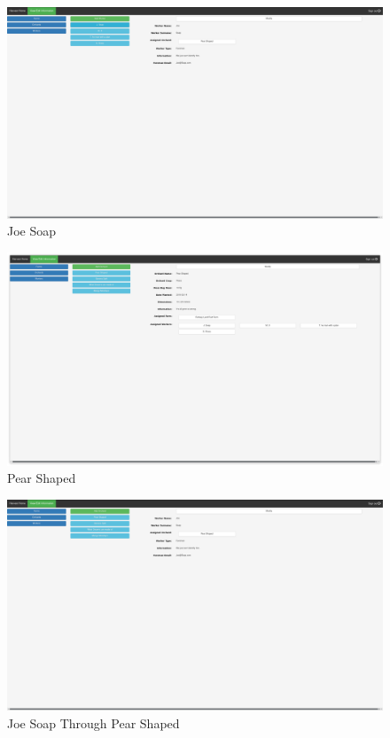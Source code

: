 \documentclass[a4paper,10pt,titlepage]{article}
\begin{document}
\begin{figure}
 \centering
 \includegraphics[width=12cm, keepaspectratio]{Images/Information-Joe.png}
 \caption{Joe Soap}
 \label{InformationPageJoe}
\end{figure}

\begin{figure}
 \centering
 \includegraphics[width=12cm, keepaspectratio]{Images/Information-Pear.png}
 \caption{Pear Shaped}
 \label{InformationPagePear}
\end{figure}

\begin{figure}
 \centering
 \includegraphics[width=12cm, keepaspectratio]{Images/Information-Joe-Pear.png}
 \caption{Joe Soap Through Pear Shaped}
 \label{InformationPageJoePear}
\end{figure}
\end{document}

